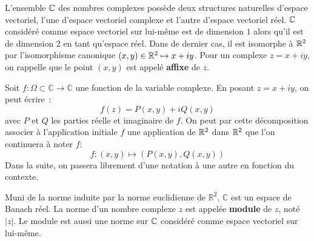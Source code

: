 L'ensemble $\mathbb{C}$ des nom\-bres complexes possède deux structures naturelles d'espace vectoriel, l'une d'espace vectoriel complexe et l'autre d'espace vectoriel réel. $\mathbb{C}$ considéré comme espace vectoriel sur lui-même est de dimension $1$ alors qu'il est de dimension 2 en tant qu'espace réel. Dans de dernier cas, il est isomorphe à $\mathbb{R}^2$ par l'isomorphisme canonique $(x,y) \in \mathbb{R}^2 \mapsto x + i y$. Pour un complexe $z=x+iy$, on rappelle que le point $(x,y)$ est appelé \textbf{affixe} de $z$.

Soit $f : \Omega \subset \mathbb{C} \to \mathbb{C}$ une fonction de la variable complexe. En posant $z = x + iy$, on peut écrire~:
\[
f(z) = P(x,y) + i Q(x,y)
\]
avec $P$ et $Q$ les parties réelle et imaginaire de $f$. On peut par cette décomposition associer à l'application initiale $f$ une application de $\mathbb{R}^2$ dans $\mathbb{R}^2$ que l'on continuera à noter $f$:
\[
f \colon (x,y) \mapsto \left(P(x,y), Q(x,y)\right)
\]
Dans la suite, on passera librement d'une notation à une autre en fonction du contexte. 

Muni de la norme induite par la norme euclidienne de $\mathbb{R}^2$,
$\mathbb{C}$ est un espace de Banach réel. La norme d'un nombre
complexe $z$ est appelée \textbf{module} de $z$, noté $|z|$.
Le module est aussi une norme sur $\mathbb{C}$ considéré comme espace vectoriel sur lui-même. 

